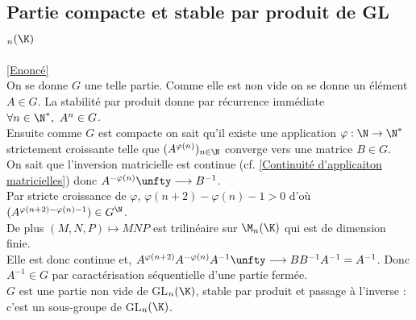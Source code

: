 \documentclass{book}
\begin{document}
	\subsection{Partie compacte et stable par produit de GL$_n(\K)$ }
	\label{sec:partie-compacte-et-stable-par-produit-de-glnk-etoile3}
	\textcolor{blue}{\hyperref[Partie compacte et stable par produit de GLn(K)]{[Enoncé]}}\\
	On se donne $G$ une telle partie. Comme elle est non vide on se donne un élément $A\in G$. La stabilité par produit donne par récurrence immédiate $\forall n\in \N^*,\ A^n\in G$.\\
	Ensuite comme $G$ est compacte on sait qu'il existe une application $\varphi:\N\to\N^*$ strictement croissante telle que $(A^{\varphi(n)})_{n\in \N}$ converge vers une matrice $B\in G$.\\
	On sait que l'inversion matricielle est continue (cf. \ref{Continuité d'applicaiton matricielles}) donc $A^{-\varphi(n)}\unfty\longrightarrow B^{-1}$.\\
	Par stricte croissance de $\varphi$, $\varphi(n+2)-\varphi(n)-1>0$ d'où $(A^{\varphi(n+2)-\varphi(n)-1})\in G^\N$.\\
	De plus $(M,N,P)\mapsto MNP$ est trilinéaire sur $\M_n(\K)$ qui est de dimension finie.\\
	Elle est donc continue et, $A^{\varphi(n+2)}A^{-\varphi(n)}A^{-1}\unfty\longrightarrow BB^{-1}A^{-1}=A^{-1}$. Donc $A^{-1}\in G$ par caractérisation séquentielle d'une partie fermée.\\
	$G$ est une partie non vide de GL$_n(\K)$, stable par produit et passage à l'inverse : c'est un sous-groupe de GL$_n(\K)$.
	
\end{document}
